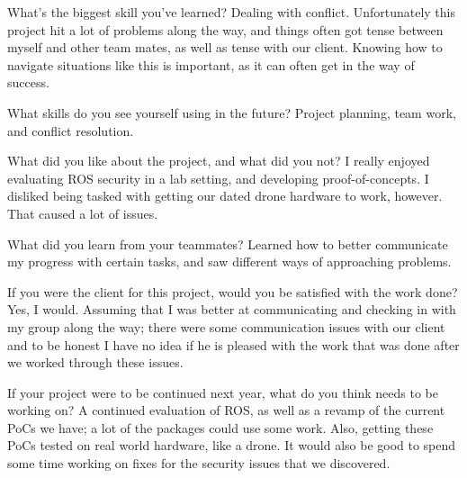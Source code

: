 \documentclass[IEEEtran,letterpaper,10pt,notitlepage,draftclsnofoot,onecolumn]{article}
\begin{document}
What's the biggest skill you've learned? Dealing with conflict. Unfortunately this project hit a lot of problems along the way, and things often got tense between myself and other team mates, as well as tense with our client. Knowing how to navigate situations like this is important, as it can often get in the way of success.

What skills do you see yourself using in the future? Project planning, team work, and conflict resolution.

What did you like about the project, and what did you not? I really enjoyed evaluating ROS security in a lab setting, and developing proof-of-concepts. I disliked being tasked with getting our dated drone hardware to work, however. That caused a lot of issues.

What did you learn from your teammates? Learned how to better communicate my progress with certain tasks, and saw different ways of approaching problems.

If you were the client for this project, would you be satisfied with the work done? Yes, I would. Assuming that I was better at communicating and checking in with my group along the way; there were some communication issues with our client and to be honest I have no idea if he is pleased with the work that was done after we worked through these issues.

If your project were to be continued next year, what do you think needs to be working on? A continued evaluation of ROS, as well as a revamp of the current PoCs we have; a lot of the packages could use some work. Also, getting these PoCs tested on real world hardware, like a drone. It would also be good to spend some time working on fixes for the security issues that we discovered.
\end{document}
